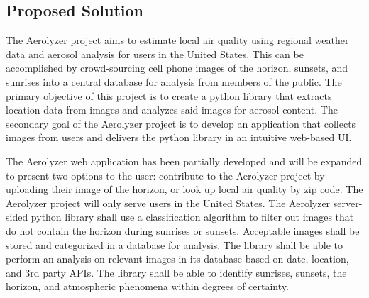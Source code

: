 \documentclass[letterpaper,10pt,draftclsnofoot,onecolumn]{IEEEtran}
\begin{document}
\begin{flushleft}
\section{Proposed Solution}
The Aerolyzer project aims to estimate local air quality using regional weather data and aerosol analysis for users in the United States. This can be accomplished by crowd-sourcing cell phone images of the horizon, sunsets, and sunrises into a central database for analysis from members of the public. The primary objective of this project is to create a python library that extracts location data from images and analyzes said images for aerosol content. The secondary goal of the Aerolyzer project is to develop an application that collects images from users and delivers the python library in an intuitive web-based UI. 
\par
The Aerolyzer web application has been partially developed and will be expanded to present two options to the user: contribute to the Aerolyzer project by uploading their image of the horizon, or look up local air quality by zip code. The Aerolyzer project will only serve users in the United States. The Aerolyzer server-sided python library shall use a classification algorithm to filter out images that do not contain the horizon during sunrises or sunsets. Acceptable images shall be stored and categorized in a database for analysis. The library shall be able to perform an analysis on relevant images in its database based on date, location, and 3rd party APIs. The library shall be able to identify sunrises, sunsets, the horizon, and atmospheric phenomena within degrees of certainty.


\end{flushleft}
\end{document}
